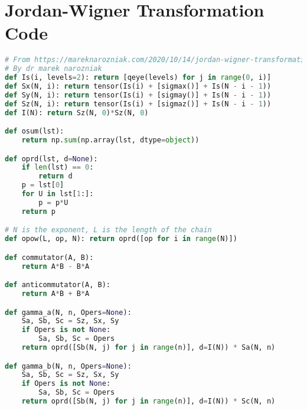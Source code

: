 \documentclass{article}
\begin{document}
\section{Jordan-Wigner Transformation Code} %
\label{sec:Jordan-Wigner Transformation Code}
\begin{lstlisting}[language=Python]
# From https://mareknarozniak.com/2020/10/14/jordan-wigner-transformation/
# By dr marek narozniak
def Is(i, levels=2): return [qeye(levels) for j in range(0, i)]
def Sx(N, i): return tensor(Is(i) + [sigmax()] + Is(N - i - 1))
def Sy(N, i): return tensor(Is(i) + [sigmay()] + Is(N - i - 1))
def Sz(N, i): return tensor(Is(i) + [sigmaz()] + Is(N - i - 1))
def I(N): return Sz(N, 0)*Sz(N, 0)

def osum(lst): 
    return np.sum(np.array(lst, dtype=object))

def oprd(lst, d=None):
    if len(lst) == 0:
        return d
    p = lst[0]
    for U in lst[1:]:
        p = p*U
    return p

# N is the exponent, L is the length of the chain
def opow(L, op, N): return oprd([op for i in range(N)])

def commutator(A, B):
    return A*B - B*A

def anticommutator(A, B):
    return A*B + B*A

def gamma_a(N, n, Opers=None):
    Sa, Sb, Sc = Sz, Sx, Sy
    if Opers is not None:
        Sa, Sb, Sc = Opers
    return oprd([Sb(N, j) for j in range(n)], d=I(N)) * Sa(N, n)

def gamma_b(N, n, Opers=None):
    Sa, Sb, Sc = Sz, Sx, Sy
    if Opers is not None:
        Sa, Sb, Sc = Opers
    return oprd([Sb(N, j) for j in range(n)], d=I(N)) * Sc(N, n)
\end{lstlisting}
\end{document}
